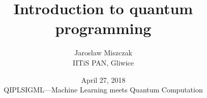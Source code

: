 \documentclass{beamer}
\title{Introduction to quantum programming}
\author{Jaros\l aw Miszczak\\ IITiS PAN, Gliwice}
\date{April 27, 2018\\ QIPLSIGML---Machine Learning meets Quantum Computation}
\begin{document}
\begin{frame}{}
   \maketitle 
\end{frame}

\begin{frame}{}
  \tableofcontents
\end{frame}

\begin{frame}{}
	
\end{frame}

\begin{frame}{}
	
\end{frame}


\begin{frame}{}
	
\end{frame}


\begin{frame}{}
	
\end{frame}


\begin{frame}{}
	
\end{frame}


\begin{frame}{}
	
\end{frame}


\begin{frame}{}
	
\end{frame}


\begin{frame}{}
	
\end{frame}
\end{document}
